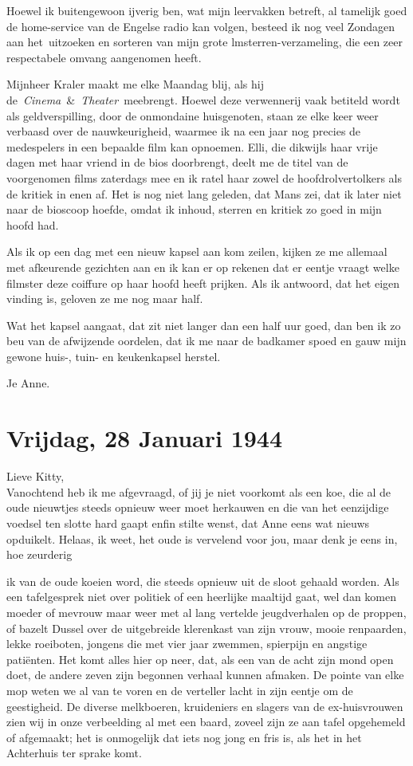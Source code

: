 \documentclass{book}
\begin{document}
Hoewel ik buitengewoon ijverig ben, wat mijn leervakken betreft, al tamelijk
goed de home-service van de Engelse radio kan volgen, besteed ik nog veel
Zondagen aan het~uitzoeken en sorteren van mijn grote lmsterren-verzameling, die
een zeer respectabele omvang aangenomen heeft.

Mijnheer Kraler maakt me elke Maandag blij, als hij
de~\emph{Cinema}~\&~\emph{Theater}~meebrengt. Hoewel deze verwennerij vaak
betiteld wordt als geldverspilling, door de onmondaine huisgenoten, staan ze
elke keer weer verbaasd over de nauwkeurigheid, waarmee ik na een jaar nog
precies de medespelers in een bepaalde film kan opnoemen.  Elli, die dikwijls
haar vrije dagen met haar vriend in de bios doorbrengt, deelt me de titel van de
voorgenomen films zaterdags mee en ik ratel haar zowel de hoofdrolvertolkers als
de kritiek in enen af. Het is nog niet lang geleden, dat Mans zei, dat ik later
niet naar de bioscoop hoefde, omdat ik inhoud, sterren en kritiek zo goed in
mijn hoofd had.

Als ik op een dag met een nieuw kapsel aan kom zeilen, kijken ze me allemaal met
afkeurende gezichten aan en ik kan er op rekenen dat er eentje vraagt welke
filmster deze coiffure op haar hoofd heeft prijken.  Als ik antwoord, dat het
eigen vinding is, geloven ze me nog maar half.

Wat het kapsel aangaat, dat zit niet langer dan een half uur goed, dan ben ik zo
beu van de afwijzende oordelen, dat ik me naar de badkamer spoed en gauw mijn
gewone huis-, tuin- en keukenkapsel herstel.

Je Anne.

\section*{Vrijdag, 28 Januari 1944}

Lieve Kitty,\\
Vanochtend heb ik me afgevraagd, of jij je niet voorkomt als een
koe, die al de oude nieuwtjes steeds opnieuw weer moet herkauwen en die van het
eenzijdige voedsel ten slotte hard gaapt enfin stilte wenst, dat Anne eens wat
nieuws opduikelt. Helaas, ik weet, het oude is vervelend voor jou, maar denk je
eens in, hoe zeurderig

ik van de oude koeien word, die steeds opnieuw uit de sloot gehaald worden. Als
een tafelgesprek niet over politiek of een heerlijke maaltijd gaat, wel dan
komen moeder of mevrouw maar weer met al lang vertelde jeugdverhalen op de
proppen, of bazelt Dussel over de uitgebreide klerenkast van zijn vrouw, mooie
renpaarden, lekke roeiboten, jongens die met vier jaar zwemmen, spierpijn en
angstige patiënten. Het komt alles hier op neer, dat, als een van de acht zijn
mond open doet, de andere zeven zijn begonnen verhaal kunnen afmaken. De pointe
van elke mop weten we al van te voren en de verteller lacht in zijn eentje om de
geestigheid. De diverse melkboeren, kruideniers en slagers van de ex-huisvrouwen
zien wij in onze verbeelding al met een baard, zoveel zijn ze aan tafel
opgehemeld of afgemaakt; het is onmogelijk dat iets nog jong en fris is, als het
in het Achterhuis ter sprake komt.
\end{document}

